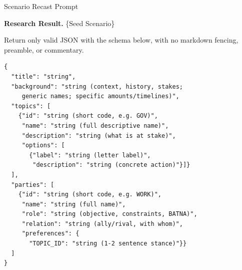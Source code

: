 \documentclass{llmxive}
\begin{document}
\begin{table}[p]
\begin{promptbox}{Scenario Recast Prompt}
\begin{userbox}
\scriptsize
\textbf{Research Result.} \{Seed Scenario\}

\smallskip
Return only valid JSON with the schema below, with no markdown fencing, preamble, or commentary.
\begin{verbatim}
{
  "title": "string",
  "background": "string (context, history, stakes;
     generic names; specific amounts/timelines)",
  "topics": [
    {"id": "string (short code, e.g. GOV)",
     "name": "string (full descriptive name)",
     "description": "string (what is at stake)",
     "options": [
       {"label": "string (letter label)",
        "description": "string (concrete action)"}]}
  ],
  "parties": [
    {"id": "string (short code, e.g. WORK)",
     "name": "string (full name)",
     "role": "string (objective, constraints, BATNA)",
     "relation": "string (ally/rival, with whom)",
     "preferences": {
       "TOPIC_ID": "string (1-2 sentence stance)"}}
  ]
}
\end{verbatim}
\end{userbox}
\end{promptbox}
\vspace{-0.25cm}
\vspace{-0.3cm}
\label{tab:prompt-scenario}
\caption{Prompt for scenario recast.}
\end{table}
\end{document}
